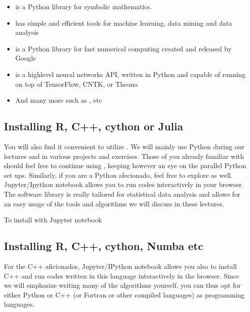 \documentclass[letterpaper,10pt,english]{sphinxmanual}
\begin{document}
\begin{itemize}
\item {} 
 is a Python library for symbolic mathematics.

\item {} 
 has simple and efficient tools for machine learning, data mining and data analysis

\item {} 
 is a Python library for fast numerical computing created and released by Google

\item {} 
 is a high\sphinxhyphen{}level neural networks API, written in Python and capable of running on top of TensorFlow, CNTK, or Theano

\item {} 
And many more such as ,   etc

\end{itemize}


\subsection{Installing R, C++, cython or Julia}
\label{\detokenize{chapter3:installing-r-c-cython-or-julia}}
You will also find it convenient to utilize . We will mainly
use Python during our lectures and in various projects and exercises.
Those of you
already familiar with  should feel free to continue using , keeping
however an eye on the parallel Python set ups. Similarly, if you are a
Python afecionado, feel free to explore  as well.  Jupyter/Ipython
notebook allows you to run  codes interactively in your
browser. The software library  is really tailored  for statistical data analysis
and allows for an easy usage of the tools and algorithms we will discuss in these
lectures.

To install  with Jupyter notebook


\subsection{Installing R, C++, cython, Numba etc}
\label{\detokenize{chapter3:installing-r-c-cython-numba-etc}}
For the C++ aficionados, Jupyter/IPython notebook allows you also to
install C++ and run codes written in this language interactively in
the browser. Since we will emphasize writing many of the algorithms
yourself, you can thus opt for either Python or C++ (or Fortran or other compiled languages) as programming
languages.
\end{document}
